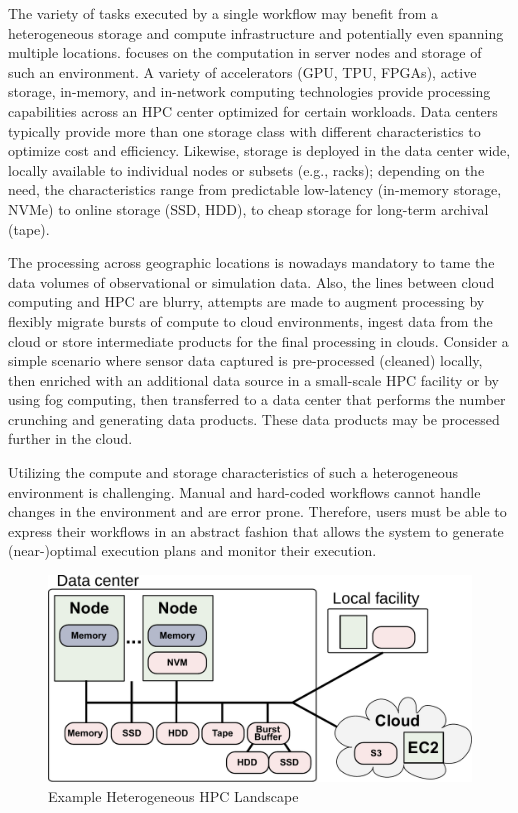 \documentclass[a4paper, twocolumn]{article}
\begin{document}
The variety of tasks executed by a single workflow may benefit from a heterogeneous storage and compute infrastructure and potentially even spanning multiple locations.
 focuses on the computation in server nodes and storage of such an environment.
A variety of accelerators (GPU, TPU, FPGAs), active storage, in-memory, and in-network computing technologies provide processing capabilities across an HPC center optimized for certain workloads.
Data centers typically provide more than one storage class with different characteristics to optimize cost and efficiency.
Likewise, storage is deployed in the data center wide, locally available to individual nodes or subsets (e.g., racks); depending on the need, the characteristics range from predictable low-latency (in-memory storage, NVMe) to online storage (SSD, HDD), to cheap storage for long-term archival (tape).

The processing across geographic locations is nowadays mandatory to tame the data volumes of observational or simulation data.
Also, the lines between cloud computing and HPC are blurry, attempts are made to augment processing by flexibly migrate bursts of compute to cloud environments, ingest data from the cloud or store intermediate products for the final processing in clouds.
Consider a simple scenario where sensor data captured is pre-processed (cleaned) locally, then enriched with an additional data source in a small-scale HPC facility or by using fog computing, then transferred to a data center that performs the number crunching and generating data products.
These data products may be processed further in the cloud.

Utilizing the compute and storage characteristics of such a heterogeneous environment is challenging.
Manual and hard-coded workflows cannot handle changes in the environment and are error prone.
Therefore, users must be able to express their workflows in an abstract fashion that allows the system to generate (near-)optimal execution plans and monitor their execution.


\begin{figure}[b]
  \centering
  \includegraphics[width=\columnwidth]{system}
  \caption{Example Heterogeneous HPC Landscape}
  \label{fig:heterogeneous}
\end{figure}
\end{document}
